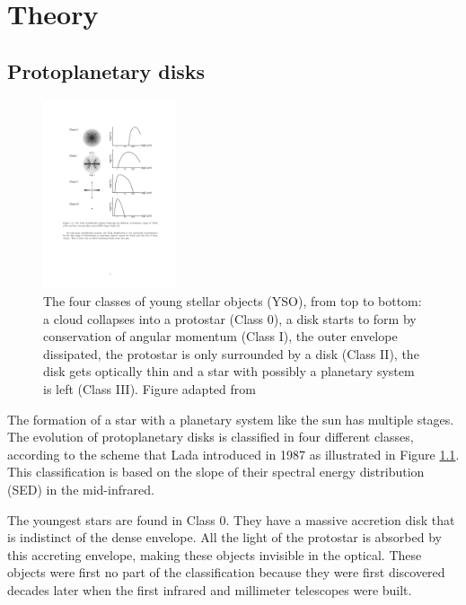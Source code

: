\documentclass[twoside,single]{lion-msc}
\begin{document}
\chapter{Theory}
\section{Protoplanetary disks}
\begin{figure}
\vspace{-3mm}
\includegraphics[trim={4cm 11cm 11cm 4cm},clip,width = 0.35\textwidth]{classscheme}
\caption{The four classes of young stellar objects (YSO), from top to bottom: a cloud collapses into a protostar (Class 0), a disk starts to form by conservation of angular momentum (Class I), the outer envelope dissipated, the protostar is only surrounded by a disk (Class II), the disk gets optically thin and a star with possibly a planetary system is left (Class III). Figure adapted from\citep{Armitage2010}}
\vspace{-65pt}
\label{fig:classscheme}
\end{figure}%

The formation of a star with a planetary system like the sun has multiple stages.  The evolution of protoplanetary disks is classified in four different classes, according to the scheme that Lada introduced in 1987\cite{Lada1987} as illustrated in Figure \ref{fig:classscheme}. This classification is based on the slope of their spectral energy distribution (SED) in the mid-infrared.
\bigskip

The youngest stars are found in Class 0. They have a massive accretion disk that is indistinct of the dense envelope. All the light of the protostar is absorbed by this accreting envelope, making these objects invisible in the optical. These objects were first no part of the classification because they were first discovered decades later when the first infrared and millimeter telescopes were built.
\bigskip
\end{document}
